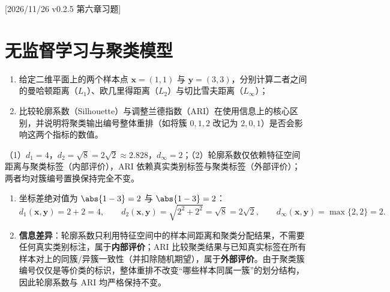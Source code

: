%
%
[2026/11/26 v0.2.5 第六章习题]
\section{无监督学习与聚类模型}

\begin{exercise}[title={闵可夫斯基距离手算与聚类评价指标辨析},level=basic,points=10,tags={距离度量,轮廓系数,ARI}]
\begin{enumerate}
  \item 给定二维平面上的两个样本点 $\bm{x} = (1, 1)$ 与 $\bm{y} = (3, 3)$，分别计算二者之间的曼哈顿距离（$L_1$）、欧几里得距离（$L_2$）与切比雪夫距离（$L_\infty$）；
  \item 比较轮廓系数（Silhouette）与调整兰德指数（ARI）在使用信息上的核心区别，并说明将聚类输出编号整体重排（如将簇 $0,1,2$ 改记为 $2,0,1$）是否会影响这两个指标的数值。
\end{enumerate}
\begin{answer}
（1）$d_1 = 4$，$d_2 = \sqrt{8} = 2\sqrt{2}\approx 2.828$，$d_\infty = 2$；（2）轮廓系数仅依赖特征空间距离与聚类标签（内部评价），ARI 依赖真实类别标签与聚类标签（外部评价）；两者均对簇编号置换保持完全不变。
\end{answer}
\begin{solution}
\begin{enumerate}
  \item 坐标差绝对值为 $\abs{1-3}=2$ 与 $\abs{1-3}=2$：
  \[
    d_1(\bm{x},\bm{y}) = 2 + 2 = 4,\qquad
    d_2(\bm{x},\bm{y}) = \sqrt{2^2 + 2^2} = \sqrt{8} = 2\sqrt{2},\qquad
    d_\infty(\bm{x},\bm{y}) = \max\{2, 2\} = 2.
  \]
  \item \textbf{信息差异}：轮廓系数只利用特征空间中的样本间距离和聚类分配结果，不需要任何真实类别标注，属于\textbf{内部评价}；ARI 比较聚类结果与已知真实标签在所有样本对上的同簇/异簇一致性（并扣除随机期望），属于\textbf{外部评价}。由于聚类簇编号仅仅是等价类的标识，整体重排不改变“哪些样本同属一簇”的划分结构，因此轮廓系数与 ARI 均严格保持不变。
\end{enumerate}
\end{solution}
\end{exercise}

